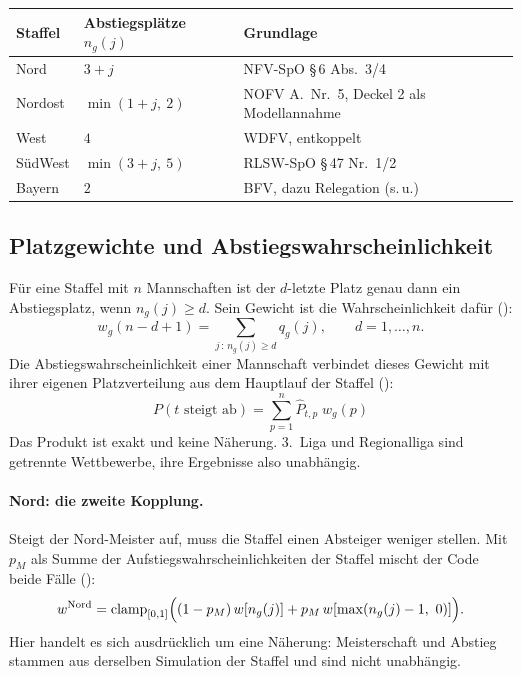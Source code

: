\begin{center}
\begin{tabular}{@{}llp{6.2cm}@{}}
\toprule
Staffel & Abstiegsplätze $n_g(j)$ & Grundlage \\
\midrule
Nord     & $3 + j$             & NFV-SpO §\,6 Abs.~3/4 \\
Nordost  & $\min(1 + j,\ 2)$   & NOFV A.\ Nr.~5, Deckel 2 als Modellannahme \\
West     & $4$                 & WDFV, entkoppelt \\
SüdWest  & $\min(3 + j,\ 5)$   & RLSW-SpO §\,47 Nr.~1/2 \\
Bayern   & $2$                 & BFV, dazu Relegation (s.\,u.) \\
\bottomrule
\end{tabular}
\end{center}

\subsection*{Platzgewichte und Abstiegswahrscheinlichkeit}

Für eine Staffel mit $n$ Mannschaften ist der $d$-letzte Platz genau dann ein
Abstiegsplatz, wenn $n_g(j) \ge d$. Sein Gewicht ist die Wahrscheinlichkeit
dafür ():
\begin{equation}
  w_g(n - d + 1) = \sum_{j \,:\, n_g(j) \ge d} q_g(j), \qquad d = 1, \dots, n.
\end{equation}
Die Abstiegswahrscheinlichkeit einer Mannschaft verbindet dieses Gewicht mit
ihrer eigenen Platzverteilung aus dem Hauptlauf der Staffel
():
\begin{equation}\label{eq:rl-abstieg}
  \boxed{\;P(t \text{ steigt ab}) = \sum_{p=1}^{n} \hat P_{t,p}\; w_g(p)\;}
\end{equation}
Das Produkt ist exakt und keine Näherung. 3.~Liga und Regionalliga sind
getrennte Wettbewerbe, ihre Ergebnisse also unabhängig.

\paragraph{Nord: die zweite Kopplung.} Steigt der Nord-Meister auf, muss die
Staffel einen Absteiger weniger stellen. Mit $p_M$ als Summe der
Aufstiegswahrscheinlichkeiten der Staffel mischt der Code beide Fälle
():
\begin{equation}
  w^{\text{Nord}} = \clamp_{[0,1]}\Bigl((1 - p_M)\, w[n_g(j)] + p_M\, w[\max(n_g(j) - 1,\ 0)]\Bigr).
\end{equation}
Hier handelt es sich ausdrücklich um eine Näherung: Meisterschaft und
Abstieg stammen aus derselben Simulation der Staffel und sind nicht
unabhängig.

